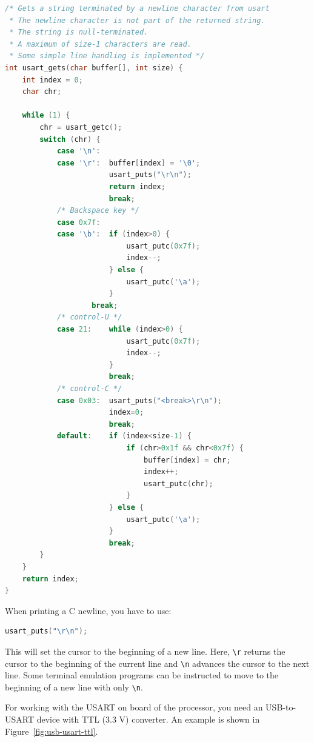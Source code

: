 \documentclass[12pt]{article}
\begin{document}
\begin{lstlisting}[language=C]
/* Gets a string terminated by a newline character from usart
 * The newline character is not part of the returned string.
 * The string is null-terminated.
 * A maximum of size-1 characters are read.
 * Some simple line handling is implemented */
int usart_gets(char buffer[], int size) {
    int index = 0;
    char chr;

    while (1) {
        chr = usart_getc();
        switch (chr) {
            case '\n':
            case '\r':  buffer[index] = '\0';
                        usart_puts("\r\n");
                        return index;
                        break;
            /* Backspace key */
            case 0x7f:
            case '\b':  if (index>0) {
                            usart_putc(0x7f);
                            index--;
                        } else {
                            usart_putc('\a');
                        }
                    break;
            /* control-U */
            case 21:    while (index>0) {
                            usart_putc(0x7f);
                            index--;
                        }
                        break;
            /* control-C */
            case 0x03:  usart_puts("<break>\r\n");
                        index=0;
                        break;
            default:    if (index<size-1) {
                            if (chr>0x1f && chr<0x7f) {
                                buffer[index] = chr;
                                index++;
                                usart_putc(chr);
                            }
                        } else {
                            usart_putc('\a');
                        }
                        break;
        }
    }
    return index;
}
\end{lstlisting}

When printing a C newline, you have to use:

\begin{lstlisting}[language=C]
usart_puts("\r\n");
\end{lstlisting}

This will set the cursor to the beginning of a new line. Here, \lstinline|\r| returns the cursor to the beginning of the current line and \lstinline|\n| advances the cursor to the next line. Some terminal emulation programs can be instructed to move to the beginning of a new line with only \lstinline|\n|.

For working with the USART on board of the processor, you need an USB-to-USART device with TTL (3.3 V) converter. An example is shown in Figure~\ref{fig:usb-usart-ttl}.
\end{document}
